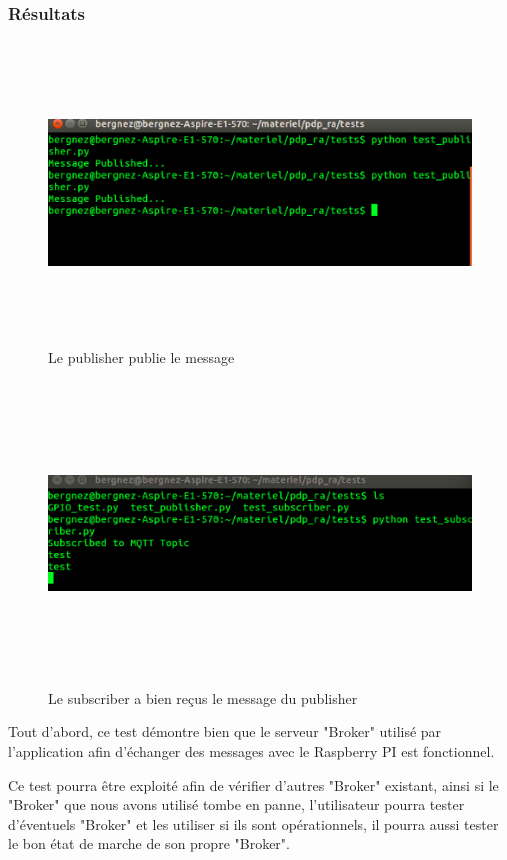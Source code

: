 \documentclass[12pt,a4paper]{article}
\begin{document}
\subsubsection{Résultats}
\begin{figure}[H]
  \centering
    \includegraphics[width = 15cm,height=8cm]{19publish.png}
     \caption{Le publisher publie le message }
\end{figure}
\begin{figure}[H]
  \centering
    \includegraphics[width = 15cm,height=8cm]{19subscr.png}
     \caption{Le subscriber a bien reçus le message du publisher 
      }
\end{figure}
Tout d'abord, ce test démontre bien que le serveur "Broker" utilisé par l'application afin d'échanger des messages avec le Raspberry PI est fonctionnel.\par
Ce test pourra être exploité afin de vérifier d'autres "Broker" existant, ainsi si le "Broker" que nous avons utilisé tombe en panne, l'utilisateur pourra tester d'éventuels "Broker" et les utiliser si ils sont opérationnels, il pourra aussi tester le bon état de marche de son propre "Broker".
\end{document}
